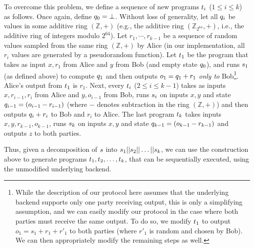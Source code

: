 To overcome this problem, we define a sequence of new programs
$t_i$ ($1\leq i\leq k$) as follows. Once again, define $q_0
= \bot$. Without
loss of generality, let all $q_i$ be values in some additive ring
$(\mathbb{Z},+)$ (e.g., the additive ring $(\mathbb{Z}_{2^{64}},+)$,
i.e., the additive ring of integers modulo $2^{64}$).
Let $r_1,\cdots,r_{k-1}$ be a sequence of random values sampled from
the same ring $(\mathbb{Z},+)$ by Alice (in our implementation, all
$r_i$ values are generated by a pseudorandom function). Let $t_1$
be the program that takes as input $x,r_1$ from Alice and $y$ from Bob
(and empty state $q_0$), and runs $s_1$ (as defined above) to
compute $q_1$ and then outputs $o_1 = q_1 + r_1$ {\em only
  to} Bob\footnote{While the description of our protocol here assumes
  that
  the underlying backend supports only one party receiving output,
  this is only a simplifying assumption, and we can easily modify our
  protocol in the case where both parties must receive the same
  output. To do so, we modify $t_1$ to output $o_1 = s_1+r_1+r'_1$ to
  both parties (where $r'_1$ is random and chosen by Bob). We can then
  appropriately modify the remaining steps as well.}. Alice's output
from $t_1$ is $r_1$. Next, every $t_i$ ($2\leq i\leq k-1$)
takes as inputs $x,r_{i-1},r_i$ from Alice and $y,o_{i-1}$ from Bob,
runs $s_i$
on inputs $x,y$ and state $q_{i-1} = (o_{i-1}-r_{i-1})$ (where $-$ denotes
subtraction in the ring $(\mathbb{Z},+)$) and then outputs $q_i+r_i$
to Bob and $r_i$ to Alice. The last
program $t_k$ takes inputs $x,y,r_{k-1},o_{k-1}$, runs $s_k$
on inputs $x,y$ and state $q_{k-1} = (o_{k-1}-r_{k-1})$ and outputs $z$ to both
parties.

Thus, given a decomposition of $s$ into
$s_1||s_2||\dots||s_k$, we can use the construction
above to generate programs $t_1,t_2,\ldots,t_k$, that
can be sequentially executed, using the unmodified underlying \mpc
backend. 

